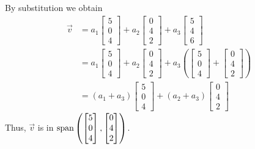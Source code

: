 \documentclass{ximera}
\begin{document}
\begin{example}
\begin{explanation}
By substitution we obtain
\begin{align*}
\vec{v}&=a_1\begin{bmatrix}5\\0\\4\end{bmatrix}+ a_2\begin{bmatrix}0\\4\\2\end{bmatrix}+a_3\begin{bmatrix}5\\4\\6\end{bmatrix}\\
&=a_1\begin{bmatrix}5\\0\\4\end{bmatrix}+ a_2\begin{bmatrix}0\\4\\2\end{bmatrix}+a_3\left(\begin{bmatrix}5\\0\\4\end{bmatrix}+\begin{bmatrix}0\\4\\2\end{bmatrix}\right)\\
&=(a_1+a_3)\begin{bmatrix}5\\0\\4\end{bmatrix}+ (a_2+a_3)\begin{bmatrix}0\\4\\2\end{bmatrix}
\end{align*} 
Thus, $\vec{v}$ is in $\textnormal{span}\left(\begin{bmatrix}5\\0\\4\end{bmatrix}, \begin{bmatrix}0\\4\\2\end{bmatrix}\right)$. 


\end{explanation}
\end{example}
\end{document}
